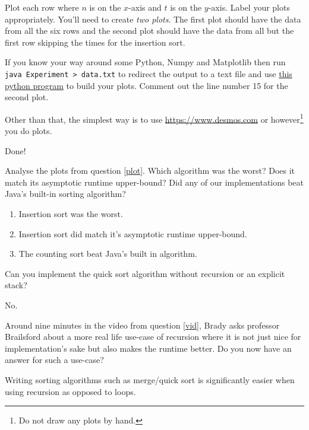 \documentclass{homework}
\begin{document}
Plot each row where $n$ is on the $x$-axis and $t$ is on the
$y$-axis. Label your plots appropriately. You'll need to create
\textit{two plots}. The first plot should have the data from all
the six rows and the second plot should have the data from all but
the first row \ie skipping the times for the insertion sort.

If you know your way around some Python, Numpy and Matplotlib then
run \texttt{java Experiment > data.txt} to redirect the output to
a text file and use
\href{https://tashfeen.org/s/ds/plot.py}{this python
  program} to build your plots. Comment out the line number 15 for
the second plot.

Other than that, the simplest way is to use
\url{https://www.desmos.com} or however\footnote{Do not draw any
  plots by hand.} you do plots.

\begin{sol}
  Done!
\end{sol}

\question Analyse the plots from question \ref{plot}. Which algorithm was the worst? Does it match its asymptotic runtime upper-bound? Did any of our implementations beat Java's built-in sorting algorithm?
\begin{sol}
  \begin{enumerate}
    \item Insertion sort was the worst.
    \item Insertion sort did match it's asymptotic runtime upper-bound.
    \item The counting sort beat Java's built in algorithm.
  \end{enumerate}
\end{sol}

\question Can you implement the quick sort algorithm without recursion or an
explicit stack?

\begin{sol}
  No.
\end{sol}

\question Around nine minutes in the video from question \ref{vid}, Brady asks professor Brailsford about a more real life use-case of recursion where it is not just nice for implementation's sake but also makes the runtime better. Do you now have an answer for such a use-case?

\begin{sol}
  Writing sorting algorithms such as merge/quick sort is significantly easier when using recursion as opposed to loops.
\end{sol}
\end{document}

